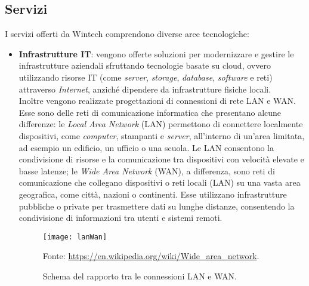 \subsection{Servizi}
I servizi offerti da Wintech comprendono diverse aree tecnologiche:
\begin{itemize}
	\item \textbf{Infrastrutture IT}: vengono offerte soluzioni per modernizzare e gestire le infrastrutture aziendali sfruttando tecnologie basate su \gls{cloud}, ovvero utilizzando risorse \gls{IT} (come \emph{server}, \emph{storage}, \emph{database}, \emph{software} e reti) attraverso \emph{Internet}, anziché dipendere da infrastrutture fisiche locali.\\
    Inoltre vengono realizzate progettazioni di connessioni di rete LAN e WAN. Esse sono delle reti di comunicazione informatica che presentano alcune differenze: le \emph{Local Area Network} (LAN) permettono di connettere localmente dispositivi, come
    \emph{computer}, stampanti e \emph{server}, all'interno di un'area limitata, ad esempio un edificio, un ufficio o una scuola. Le LAN consentono la condivisione di risorse e la comunicazione tra dispositivi con velocità elevate e basse latenze; 
    le \emph{Wide Area Network} (WAN), a differenza, sono reti di comunicazione che collegano dispositivi o reti locali (LAN) su una vasta area geografica, come città, nazioni o continenti. Esse utilizzano infrastrutture pubbliche o private per trasmettere dati su lunghe distanze, consentendo la condivisione di informazioni tra utenti e sistemi remoti.\\
    \begin{figure}[htbp] 
        \centering 
        \texttt{[image: lanWan]}
        \caption{Schema del rapporto tra le connessioni LAN e WAN.} 
        \label{fig:lanWan}
        Fonte: \url{https://en.wikipedia.org/wiki/Wide_area_network}.
    \end{figure}


\end{itemize}
